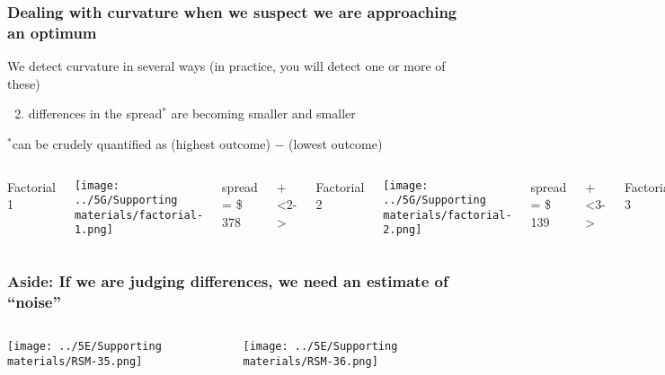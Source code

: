 \begin{frame}\frametitle{Dealing with curvature when we suspect we are approaching an optimum}
	{\color{myOrange}We detect curvature in several ways (in practice, you will detect one or more of these)}
	
	\vspace{.7cm}
	\begin{enumerate}\setcounter{enumi}{1}
		\item	differences in the {\color{myGreen} spread}$^\ast$ are becoming smaller and smaller
	\end{enumerate}
	
	\vspace{.3cm}
	$^\ast${\color{myGreen}\scriptsize can be crudely quantified as (highest outcome) $-$ (lowest outcome)}
	\vspace{.5cm}
	\begin{columns}[T]
			Factorial 1
			
			\vspace{.5cm}
			\centerline{\texttt{[image: ../5G/Supporting materials/factorial-1.png]}}
			
			spread = \$ 378
		
			\onslide+<2->{
				Factorial 2 
			
				\vspace{.5cm}
				\centerline{\texttt{[image: ../5G/Supporting materials/factorial-2.png]}}
			
				spread = \$ 139
			}
			\onslide+<3->{
				Factorial 3
				
				\vspace{.5cm}
				\centerline{\texttt{[image: ../5G/Supporting materials/factorial-3.png]}}
			
				\vspace{0.4cm}
				spread = \$ 20
			}
	\end{columns}
	
\end{frame}

\begin{frame}\frametitle{{\color{red} Aside}: If we are judging differences, we need an estimate of ``noise''}
	\begin{columns}[T]
			\centerline{\texttt{[image: ../5E/Supporting materials/RSM-35.png]}}
			\centerline{\texttt{[image: ../5E/Supporting materials/RSM-36.png]}}
	\end{columns}	
\end{frame}

